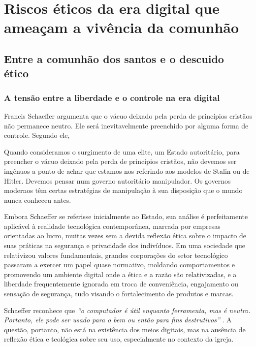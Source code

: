 \chapter{Riscos éticos da era digital que ameaçam a vivência da comunhão}

\section{Entre a comunhão dos santos e o descuido ético}

\subsection{A tensão entre a liberdade e o controle na era digital}

Francis Schaeffer argumenta que o vácuo deixado pela perda de princípios cristãos não permanece neutro. Ele será inevitavelmente preenchido por alguma forma de controle. Segundo ele,
\begin{citacao}
Quando consideramos o surgimento de uma elite, um Estado autoritário, para preencher o vácuo deixado pela perda de princípios cristãos, não devemos ser ingênuos a ponto de achar que estamos nos referindo aos modelos de Stalin ou de Hitler. Devemos pensar num governo autoritário manipulador. Os governos modernos têm certas estratégias de manipulação à sua disposição que o mundo nunca conheceu antes. \cite[p.~181]{schaeffer2002}
\end{citacao}

Embora Schaeffer se referisse inicialmente ao Estado, sua análise é perfeitamente aplicável à realidade tecnológica contemporânea, marcada por empresas orientadas ao lucro, muitas vezes sem a devida reflexão ética sobre o impacto de suas práticas na segurança e privacidade dos indivíduos. Em uma sociedade que relativizou valores fundamentais, grandes corporações do setor tecnológico passaram a exercer um papel quase normativo, moldando comportamentos e promovendo um ambiente digital onde a ética e a razão são relativizadas, e a liberdade frequentemente ignorada em troca de conveniência, engajamento ou sensação de segurança, tudo visando o fortalecimento de produtos e marcas.

Schaeffer reconhece que \textit{``o computador é útil enquanto ferramenta, mas é neutro. Portanto, ele pode ser usado para o bem ou então para fins destrutivos''} \cite[p.~179]{schaeffer2002}. A questão, portanto, não está na existência dos meios digitais, mas na ausência de reflexão ética e teológica sobre seu uso, especialmente no contexto da igreja.

